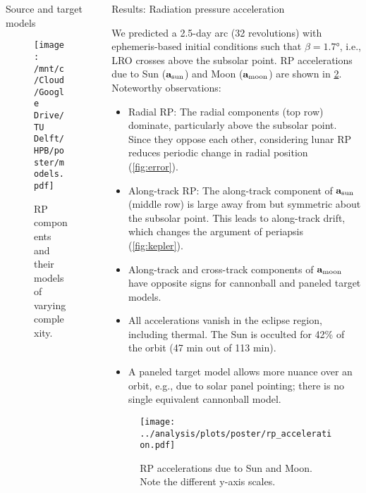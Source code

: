 \documentclass[final,20pt]{beamer}
\begin{document}
\begin{frame}[t]
\begin{columns}[t]
\begin{column}{\colwidth}
\begin{block}{Source and target models}
    \begin{figure}[B]
      \centering
      \texttt{[image: /mnt/c/Cloud/Google Drive/TU Delft/HPB/poster/models.pdf]}
      \caption{RP components and their models of varying complexity.}
      \label{fig:models}
    \end{figure}

    

  \end{block}

\end{column}

\separatorcolumn

\begin{column}{\colwidth}

  \begin{block}{Results: Radiation pressure acceleration}

    We predicted a 2.5-day arc (32 revolutions) with ephemeris-based initial conditions such that $\beta = \ang{1.7}$, i.e., LRO crosses above the subsolar point. RP accelerations due to Sun ($\vb a_\text{sun}$) and Moon ($\vb a_\text{moon}$) are shown in \cref{fig:acc}. Noteworthy observations:
    \begin{itemize}
      \item Radial RP: The radial components (top row) dominate, particularly above the subsolar point. Since they oppose each other, considering lunar RP reduces periodic change in radial position (\cref{fig:error}).
      \item Along-track RP: The along-track component of $\vb a_\text{sun}$ (middle row) is large away from but symmetric about the subsolar point. This leads to along-track drift, which changes the argument of periapsis (\cref{fig:kepler}).
      \item Along-track and cross-track components of $\vb a_\text{moon}$ have opposite signs for cannonball and paneled target models.
      \item All accelerations vanish in the eclipse region, including thermal. The Sun is occulted for 42\% of the orbit (47 min out of 113 min).
      \item A paneled target model allows more nuance over an orbit, e.g., due to solar panel pointing; there is no single equivalent cannonball model.
    \end{itemize}

    \begin{figure}[h]
      \centering
      \texttt{[image: ../analysis/plots/poster/rp\_acceleration.pdf]}
      \caption{RP accelerations due to Sun and Moon. Note the different y-axis scales.}
      \label{fig:acc}
    \end{figure}


\end{block}
\end{column}
\end{columns}
\end{frame}
\end{document}
